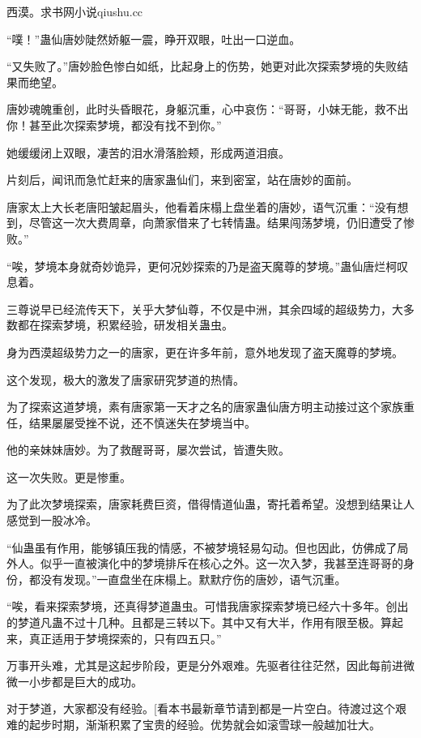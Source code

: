 
\begin{this_body}

西漠。求书网小说qiushu.cc

“噗！”蛊仙唐妙陡然娇躯一震，睁开双眼，吐出一口逆血。

“又失败了。”唐妙脸色惨白如纸，比起身上的伤势，她更对此次探索梦境的失败结果而绝望。

唐妙魂魄重创，此时头昏眼花，身躯沉重，心中哀伤：“哥哥，小妹无能，救不出你！甚至此次探索梦境，都没有找不到你。”

她缓缓闭上双眼，凄苦的泪水滑落脸颊，形成两道泪痕。

片刻后，闻讯而急忙赶来的唐家蛊仙们，来到密室，站在唐妙的面前。

唐家太上大长老唐阳皱起眉头，他看着床榻上盘坐着的唐妙，语气沉重：“没有想到，尽管这一次大费周章，向萧家借来了七转情蛊。结果闯荡梦境，仍旧遭受了惨败。”

“唉，梦境本身就奇妙诡异，更何况妙探索的乃是盗天魔尊的梦境。”蛊仙唐烂柯叹息着。

三尊说早已经流传天下，关乎大梦仙尊，不仅是中洲，其余四域的超级势力，大多数都在探索梦境，积累经验，研发相关蛊虫。

身为西漠超级势力之一的唐家，更在许多年前，意外地发现了盗天魔尊的梦境。

这个发现，极大的激发了唐家研究梦道的热情。

为了探索这道梦境，素有唐家第一天才之名的唐家蛊仙唐方明主动接过这个家族重任，结果屡屡受挫不说，还不慎迷失在梦境当中。

他的亲妹妹唐妙。为了救醒哥哥，屡次尝试，皆遭失败。

这一次失败。更是惨重。

为了此次梦境探索，唐家耗费巨资，借得情道仙蛊，寄托着希望。没想到结果让人感觉到一股冰冷。

“仙蛊虽有作用，能够镇压我的情感，不被梦境轻易勾动。但也因此，仿佛成了局外人。似乎一直被演化中的梦境排斥在核心之外。这一次入梦，我甚至连哥哥的身份，都没有发现。”一直盘坐在床榻上。默默疗伤的唐妙，语气沉重。

“唉，看来探索梦境，还真得梦道蛊虫。可惜我唐家探索梦境已经六十多年。创出的梦道凡蛊不过十几种。且都是三转以下。其中又有大半，作用有限至极。算起来，真正适用于梦境探索的，只有四五只。”

万事开头难，尤其是这起步阶段，更是分外艰难。先驱者往往茫然，因此每前进微微一小步都是巨大的成功。

对于梦道，大家都没有经验。[看本书最新章节请到都是一片空白。待渡过这个艰难的起步时期，渐渐积累了宝贵的经验。优势就会如滚雪球一般越加壮大。


\end{this_body}
